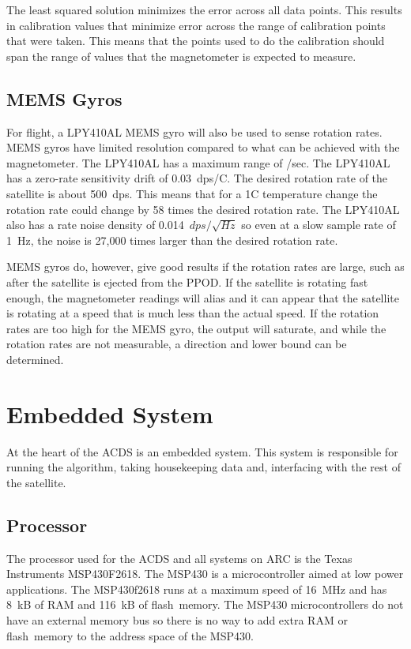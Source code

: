 The least squared solution minimizes the error across all data points. This results in calibration values that minimize error across the range of calibration points that were taken. This means that the points used to do the calibration should span the range of values that the magnetometer is expected to measure. 

\subsection{\acs*{MEMS} Gyros}

For flight, a LPY410AL \ac{MEMS} gyro will also be used to sense rotation rates. \ac{MEMS} gyros have limited resolution compared to what can be achieved with the magnetometer. The LPY410AL has a maximum range of \textdegree /sec. The LPY410AL has a zero-rate sensitivity drift of 0.03~dps/\textdegree C. The desired rotation rate of the satellite is about 500~\textmu dps. This means that for a 1\textdegree C temperature change the rotation rate could change by 58 times the desired rotation rate. The LPY410AL also has a rate noise density of 0.014~$\unit{dps}{/}\sqrt{\unit{Hz}}$ so even at a slow sample rate of 1~Hz, the noise is 27,000 times larger than the desired rotation rate.

\ac{MEMS} gyros do, however, give good results if the rotation rates are large, such as after the satellite is ejected from the \ac{PPOD}. If the satellite is rotating fast enough, the magnetometer readings will alias and it can appear that the satellite is rotating at a speed that is much less than the actual speed. If the rotation rates are too high for the \ac{MEMS} gyro, the output will saturate, and while the rotation rates are not measurable, a direction and lower bound can be determined.


\section{Embedded System}

At the heart of the \ac{ACDS} is an embedded system. This system is responsible for running the algorithm, taking housekeeping data and, interfacing with the rest of the satellite.

\subsection{Processor}

The processor used for the \ac{ACDS} and all systems on \ac{ARC} is the Texas Instruments MSP430F2618. The MSP430 is a microcontroller aimed at low power applications. The MSP430f2618 runs at a maximum speed of 16~MHz and has 8~kB of \ac{RAM} and 116~kB of flash~memory. The MSP430 microcontrollers do not have an external memory bus so there is no way to add extra \ac{RAM} or flash~memory to the address space of the MSP430.

